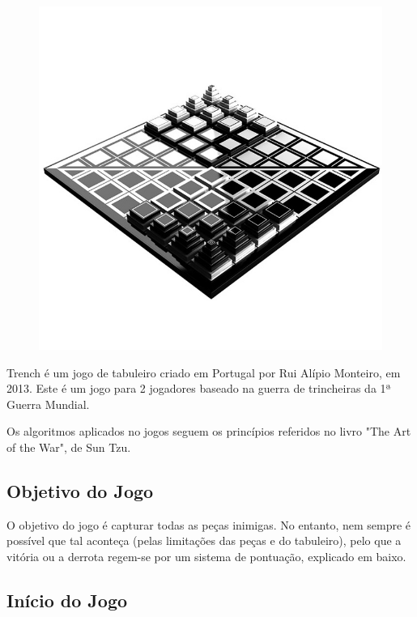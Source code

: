 \documentclass[a4paper]{article}
\begin{document}
\begin{figure}[h!]
\begin{center}
\includegraphics[scale=0.3]{img/game-cover.jpg}
\label{fig:0}
\end{center}
\end{figure}

Trench é um jogo de tabuleiro criado em Portugal por Rui Alípio Monteiro, em 2013. Este é um jogo para 2 jogadores baseado na guerra de trincheiras da 1ª Guerra Mundial. 

Os algoritmos aplicados no jogos seguem os princípios referidos no livro "The Art of the War", de Sun Tzu. 

\subsection{Objetivo do Jogo}

O objetivo do jogo é capturar todas as peças inimigas. No entanto, nem sempre é possível que tal aconteça (pelas limitações das peças e do tabuleiro), pelo que a vitória ou a derrota regem-se por um sistema de pontuação, explicado em baixo.

\subsection{Início do Jogo}
\end{document}
